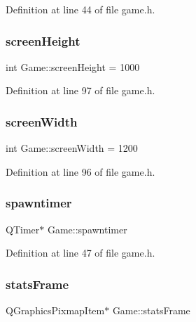 Definition at line 44 of file game.\+h.

\mbox{\label{class_game_a329351d67993953391a6a65db536c017}} 
\subsubsection{\texorpdfstring{screen\+Height}{screenHeight}}
{\footnotesize\ttfamily int Game\+::screen\+Height = 1000}



Definition at line 97 of file game.\+h.

\mbox{\label{class_game_ab1ca40d8527bb09e773bb97030b7a5cc}} 
\subsubsection{\texorpdfstring{screen\+Width}{screenWidth}}
{\footnotesize\ttfamily int Game\+::screen\+Width = 1200}



Definition at line 96 of file game.\+h.

\mbox{\label{class_game_a4a8895723160ca3585fe140e476aea1f}} 
\subsubsection{\texorpdfstring{spawntimer}{spawntimer}}
{\footnotesize\ttfamily Q\+Timer$\ast$ Game\+::spawntimer}



Definition at line 47 of file game.\+h.

\mbox{\label{class_game_a3b40718d348c0f12af63a3f428924ab4}} 
\subsubsection{\texorpdfstring{stats\+Frame}{statsFrame}}
{\footnotesize\ttfamily Q\+Graphics\+Pixmap\+Item$\ast$ Game\+::stats\+Frame}



